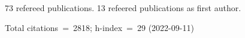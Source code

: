 73 refereed publications. 13 refeered publications as first author.

Total citations~=~2818; h-index~=~29 (2022-09-11)